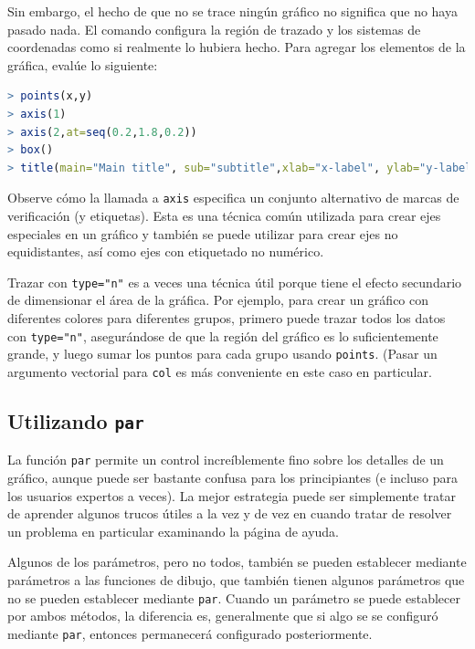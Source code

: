 Sin embargo, el hecho de que no se trace ningún gráfico no significa que no haya
pasado nada. El comando configura la región de trazado y los sistemas de
coordenadas como si realmente lo hubiera hecho. Para agregar los elementos de la
gráfica, evalúe lo siguiente:

\begin{lstlisting}[language=R]
> points(x,y)
> axis(1)
> axis(2,at=seq(0.2,1.8,0.2))
> box()
> title(main="Main title", sub="subtitle",xlab="x-label", ylab="y-label")
\end{lstlisting}

Observe cómo la llamada a \texttt{axis} especifica un conjunto alternativo de
marcas de verificación (y etiquetas). Esta es una técnica común utilizada para
crear ejes especiales en un gráfico y también se puede utilizar para crear ejes
no equidistantes, así como ejes con etiquetado no numérico.

Trazar con \texttt{type="n"} es a veces una técnica útil porque tiene el efecto
secundario de dimensionar el área de la gráfica. Por ejemplo, para crear un
gráfico con diferentes colores para diferentes grupos, primero puede trazar
todos los datos con \texttt{type="n"}, asegurándose de que la región del gráfico
es lo suficientemente grande, y luego sumar los puntos para cada grupo usando
\texttt{points}. (Pasar un argumento vectorial para \texttt{col} es más
conveniente en este caso en particular.

\subsection{Utilizando \texttt{par}}

La función \texttt{par} permite un control increíblemente fino sobre los
detalles de un gráfico, aunque puede ser bastante confusa para los principiantes
(e incluso para los usuarios expertos a veces). La mejor estrategia puede ser
simplemente tratar de aprender algunos trucos útiles a la vez y de vez en cuando
tratar de resolver un problema en particular examinando la página de ayuda.

Algunos de los parámetros, pero no todos, también se pueden establecer mediante
parámetros a las funciones de dibujo, que también tienen algunos parámetros que
no se pueden establecer mediante \texttt{par}.  Cuando un parámetro se puede
establecer por ambos métodos, la diferencia es, generalmente que si algo se se
configuró mediante \texttt{par}, entonces permanecerá configurado
posteriormente.

